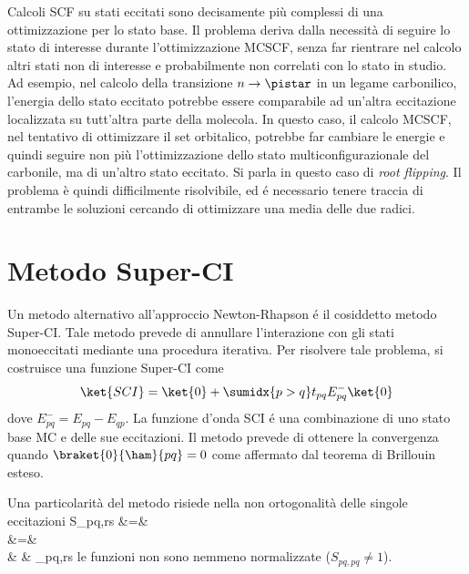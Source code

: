Calcoli SCF su stati eccitati sono decisamente pi\`u complessi di una
ottimizzazione per lo stato base. Il problema deriva dalla necessit\`a di
seguire lo stato di interesse durante l'ottimizzazione MCSCF, senza far
rientrare nel calcolo altri stati non di interesse e probabilmente non
correlati con lo stato in studio. Ad esempio, nel calcolo della
transizione $n \rightarrow \pistar$ in un legame carbonilico, l'energia
dello stato eccitato potrebbe essere comparabile ad un'altra eccitazione
localizzata su tutt'altra parte della molecola. In questo caso, il
calcolo MCSCF, nel tentativo di ottimizzare il set orbitalico, potrebbe
far cambiare le energie e quindi seguire non pi\`u l'ottimizzazione dello
stato multiconfigurazionale del carbonile, ma di un'altro stato
eccitato. Si parla in questo caso di \textit{root flipping}. Il problema 
\`e quindi difficilmente risolvibile, ed \'e necessario tenere traccia di entrambe 
le soluzioni cercando di ottimizzare una media delle due radici.

\section{Metodo Super-CI}
Un metodo alternativo all'approccio Newton-Rhapson \'e il cosiddetto
metodo Super-CI.
Tale metodo prevede di annullare l'interazione con gli stati
monoeccitati mediante una procedura iterativa.
Per risolvere tale problema, si costruisce una funzione Super-CI come
$$
\ket{SCI} = \ket{0} + \sumidx{p>q}t_{pq}E_{pq}^-\ket{0}
$$
dove $E_{pq}^- = E_{pq} - E_{qp}$.
La funzione d'onda SCI \'e una combinazione di uno stato base MC e delle
sue eccitazioni. Il metodo prevede di ottenere la convergenza quando
$\braket{0}{\ham}{pq} = 0$ come affermato dal teorema di Brillouin
esteso.

Una particolarit\`a del metodo risiede nella non ortogonalit\`a delle
singole eccitazioni
\beqas
S_{pq,rs} &=&  \\
&=&  \\
& \neq & \delta_{pq,rs}
\eeqas
le funzioni non sono nemmeno normalizzate ($S_{pq,pq} \neq 1$).

